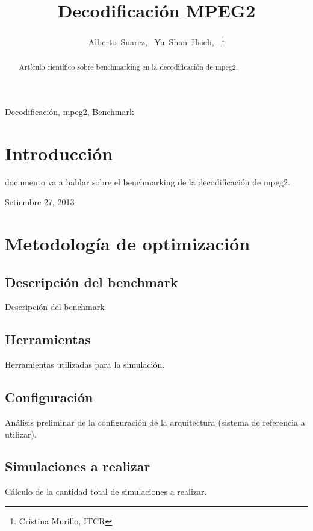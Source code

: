 \documentclass[journal]{IEEEtran}
\begin{document}
%
\title{Decodificaci\'{o}n MPEG2}
\author{Alberto~Suarez,~
        Yu~Shan~Hsieh,~%
\thanks{Cristina Murillo, ITCR}%
}
\maketitle

\begin{abstract}
Art\'{i}culo cient\'{i}fico sobre benchmarking en la decodificaci\'{o}n de mpeg2.
\end{abstract}

\begin{IEEEkeywords}
Decodificaci\'{o}n, mpeg2, Benchmark
\end{IEEEkeywords}

\section{Introducci\'{o}n}
 documento va a hablar sobre el benchmarking de la decodificaci\'{o}n de mpeg2.

\hfill Setiembre 27, 2013

\section{Metodolog\'{i}a de optimizaci\'{o}n}

\subsection{Descripci\'{o}n del benchmark}
Descripci\'{o}n del benchmark

\subsection{Herramientas}
Herramientas utilizadas para la simulaci\'{o}n.

\subsection{Configuraci\'{o}n}
An\'{a}lisis preliminar de la configuraci\'{o}n de la arquitectura (sistema de referencia a utilizar).

\subsection{Simulaciones a realizar}
C\'{a}lculo de la cantidad total de simulaciones a realizar.
\end{document}
